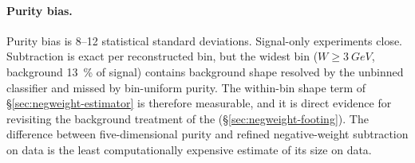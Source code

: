 \paragraph{Purity bias.} Purity bias is 8--12 statistical standard deviations. Signal-only experiments close. Subtraction is exact per reconstructed bin, but the widest bin ($W\ge\SI{3}{GeV}$, background \SI{13}{\percent} of signal) contains background shape resolved by the unbinned classifier and missed by bin-uniform purity. The within-bin shape term of \S\ref{sec:negweight-estimator} is therefore measurable, and it is direct evidence for revisiting the background treatment of the \resFiveAxis{} (\S\ref{sec:negweight-footing}). The difference between five-dimensional purity and refined negative-weight subtraction on data is the least computationally expensive estimate of its size on data.
